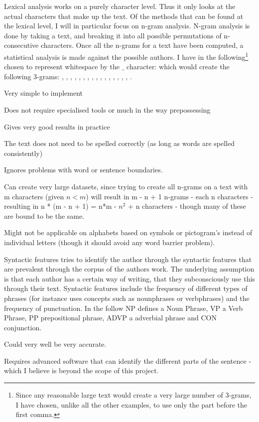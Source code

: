 {Lexical analysis works on a purely character level. Thus it only looks at the actual characters that make up the text. Of the methods that can be found at the lexical level, I will in particular focus on n-gram analysis. N-gram analysis is done by taking a text, and breaking it into all possible permutations of n-consecutive characters. Once all the n-grams for a text have been computed, a statistical analysis is made against the possible authors.
}
{
I have in the following\footnote{Since any reasonable large text would create a very large number of 3-grams, I have chosen, unlike all the other examples, to use only the part before the first comma.} chosen to represent whitespace by the $\_$ character:
which would create the following 3-grams: , , , , , , , , , , , , , , , , . 
}
{
\item Very simple to implement
\item Does not require specialised tools or much in the way prepossessing
\item Gives very good results in practice
\item The text does not need to be spelled correctly (as long as words are spelled consistently)
\item Ignores problems with word or sentence boundaries.
}
{
\item Can create very large datasets, since trying to create all n-grams on a text with m characters (given $n < m$) will result in m - n + 1 n-grams - each n characters - resulting in n * (m - n + 1) = n*m - $n^2$ + n characters - though many of these are bound to be the same.
\item Might not be applicable on alphabets based on symbols or pictogram's instead of individual letters (though it should avoid any word barrier problem).
}

{Syntactic features tries to identify the author through the syntactic
features that are prevalent through the corpus of the authors
work. The underlying assumption is that each author has a certain way of writing, that they subconsciously use this through their text. Syntactic features include the frequency of different types of phrases (for instance \cite{style} uses concepts such as nounphrases or verbphrases) and the frequency of punctuation.
} 
{
In the follow NP defines a Noun Phrase, VP a Verb Phrase, PP prepositional phrase, ADVP a adverbial phrase and CON conjunction.
}
{
\item Could very well be very accurate.
}{
\item Requires advanced software that can identify the different parts of the sentence - which I believe is beyond the scope of this project. 
}

